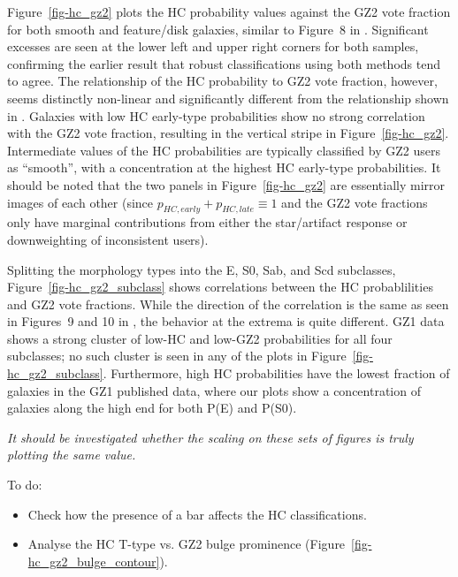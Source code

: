 \documentclass[useAMS,usenatbib]{mn2e}
\begin{document}
Figure~\ref{fig-hc_gz2} plots the HC probability values against the GZ2 vote fraction for both smooth and feature/disk galaxies, similar to Figure~8 in \citet{hue11}. Significant excesses are seen at the lower left and upper right corners for both samples, confirming the earlier result that robust classifications using both methods tend to agree. The relationship of the HC probability to GZ2 vote fraction, however, seems distinctly non-linear and significantly different from the relationship shown in \citet{hue11}. Galaxies with low HC early-type probabilities show no strong correlation with the GZ2 vote fraction, resulting in the vertical stripe in Figure~\ref{fig-hc_gz2}. Intermediate values of the HC probabilities are typically classified by GZ2 users as ``smooth'', with a concentration at the highest HC early-type probabilities. It should be noted that the two panels in Figure~\ref{fig-hc_gz2} are essentially mirror images of each other (since $p_{HC,early} + p_{HC,late} \equiv 1$ and the GZ2 vote fractions only have marginal contributions from either the star/artifact response or downweighting of inconsistent users). 

Splitting the morphology types into the E, S0, Sab, and Scd subclasses, Figure~\ref{fig-hc_gz2_subclass} shows correlations between the HC probablilities and GZ2 vote fractions. While the direction of the correlation is the same as seen in Figures~9 and 10 in \citet{hue11}, the behavior at the extrema is quite different. GZ1 data shows a strong cluster of low-HC and low-GZ2 probabilities for all four subclasses; no such cluster is seen in any of the plots in Figure~\ref{fig-hc_gz2_subclass}. Furthermore, high HC probabilities have the lowest fraction of galaxies in the GZ1 published data, where our plots show a concentration of galaxies along the high end for both P(E) and P(S0). 

{\em It should be investigated whether the scaling on these sets of figures is truly plotting the same value. }

To do:
\begin{itemize}
	\item Check how the presence of a bar affects the HC classifications.
	\item Analyse the HC T-type vs. GZ2 bulge prominence (Figure~\ref{fig-hc_gz2_bulge_contour}).
\end{itemize}
\end{document}
